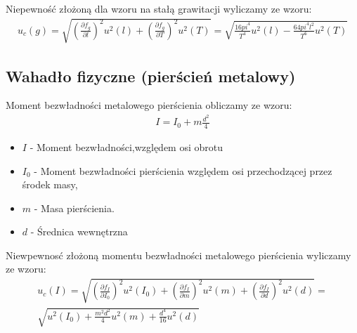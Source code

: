 \documentclass[11pt]{article}
\begin{document}
    \noindent Niepewność złożoną dla wzoru na stałą grawitacji wyliczamy ze wzoru:
    \begin{gather*}
        u_c(g) = \sqrt{\left (\frac{\partial f_g}{\partial l}\right )^2u^2(l)+\left (\frac{\partial f_g}{\partial T}\right )^2u^2(T)} = \sqrt{\frac{16pi^4}{T^4}u^2(l)-\frac{64pi^4l^2}{T^6}u^2(T)}
    \end{gather*}

    \subsection{Wahadło fizyczne (pierścień metalowy)}
    \noindent Moment bezwładności metalowego pierścienia obliczamy ze wzoru:
    \begin{gather*}
        I = I_0 + m \frac{d^2}{4}
    \end{gather*}
    {\footnotesize\begin{itemize}
         \setlength\itemsep{0.1em}
         \item[] $I$ - Moment bezwładności,względem osi obrotu
         \item[] $I_0$ - Moment bezwładności pierścienia względem osi przechodzącej przez środek masy,
         \item[] $m$ - Masa pierścienia.
         \item[] $d$ - Średnica wewnętrzna
    \end{itemize}}
    \noindent Niewpewnosć złożoną momentu bezwładności metalowego pierścienia wyliczamy ze wzoru:
    \begin{gather*}
        u_c(I) = \sqrt{\left (\frac{\partial f_I}{\partial I_0}\right )^2u^2(I_0)+\left (\frac{\partial f_I}{\partial m}\right )^2u^2(m) + \left (\frac{\partial f_I}{\partial d}\right )^2u^2(d)} = \\ \sqrt{u^2(I_0) + \frac{m^2d^2}{4}u^2(m) + \frac{d^4}{16}u^2(d)}
    \end{gather*}
\end{document}
